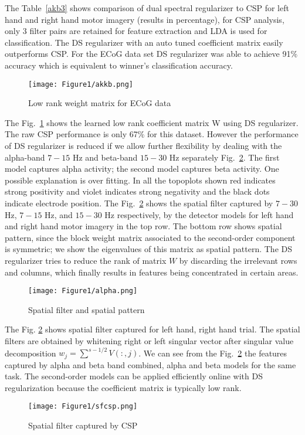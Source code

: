 The Table~\ref{akb3} shows comparison of dual spectral regularizer to CSP for left hand and right hand motor imagery (results in percentage), for CSP analysis, only 3 filter pairs are retained for feature extraction and LDA is used for classification. The DS regularizer with an auto tuned coefficient matrix easily outperforms CSP. For the ECoG data set DS regularizer was able to achieve 91$ \% $ accuracy which is equivalent to winner's classification accuracy.
\begin{figure}[hbtp]
\centering
\texttt{[image: Figure1/akkb.png]}
\caption{Low rank weight matrix for ECoG data}
\label{akkb}
\end{figure}
The Fig.~\ref{akkb} shows the learned low rank coefficient matrix W using DS regularizer. The raw CSP performance is only 67$ \% $ for this dataset. However the performance of DS regularizer is reduced if we allow further flexibility by dealing with the alpha-band $7-15$ Hz and beta-band $15-30$ Hz separately Fig.~\ref{alp}. The first model captures alpha activity; the second model captures beta activity. One possible explanation is over fitting. In all the topoplots shown red indicates strong positivity and violet indicates strong negativity and the black dots indicate electrode position. The Fig.~\ref{alp} shows the spatial filter captured by $7-30$ Hz, $7-15$ Hz, and $15-30$ Hz respectively, by the detector models for left hand and right hand motor imagery in the top row. The bottom row shows spatial pattern, since the block weight matrix associated to the second-order component is symmetric; we show the eigenvalues of this matrix as spatial pattern. The DS regularizer tries to reduce the rank of matrix $W$ by discarding the irrelevant rows and columns, which finally results in features being concentrated in certain areas.
\begin{figure}[hbtp]
\centering
\texttt{[image: Figure1/alpha.png]}
\caption{Spatial filter and spatial pattern}
\label{alp}
\end{figure}

The Fig. \ref{alp} shows spatial filter captured for left hand, right hand trial. The spatial filters are obtained by whitening right or left singular vector after singular value decomposition $w_j=\sum^{s-1/2} V(:,j)$.  We can see from the Fig.~\ref{alp} the features captured by alpha and beta band combined, alpha and beta models for the same task. The second-order models can be applied efficiently online with DS regularization because the coefficient matrix is typically low rank. 
\begin{figure}[hbtp]
\centering
\texttt{[image: Figure1/sfcsp.png]}
\caption{Spatial filter captured by CSP}
\label{alp1}
\end{figure}

